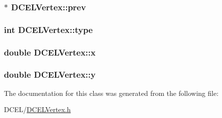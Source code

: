 \subsubsection[{\texorpdfstring{prev}{prev}}]{$\ast$ D\+C\+E\+L\+Vertex\+::prev}\hypertarget{classDCELVertex_a00e5cbac7901ae7c8c786597502ed6d8}{}\label{classDCELVertex_a00e5cbac7901ae7c8c786597502ed6d8}
\subsubsection[{\texorpdfstring{type}{type}}]{\setlength{\rightskip}{0pt plus 5cm}int D\+C\+E\+L\+Vertex\+::type}\hypertarget{classDCELVertex_a7c389ebf0d0887e1be79ba4da089522c}{}\label{classDCELVertex_a7c389ebf0d0887e1be79ba4da089522c}
\subsubsection[{\texorpdfstring{x}{x}}]{\setlength{\rightskip}{0pt plus 5cm}double D\+C\+E\+L\+Vertex\+::x}\hypertarget{classDCELVertex_a0a8a36f7b24698829b31ab03e01dd07d}{}\label{classDCELVertex_a0a8a36f7b24698829b31ab03e01dd07d}
\subsubsection[{\texorpdfstring{y}{y}}]{\setlength{\rightskip}{0pt plus 5cm}double D\+C\+E\+L\+Vertex\+::y}\hypertarget{classDCELVertex_aa9ca8760cf4043aeb5c7d9d981d9bb99}{}\label{classDCELVertex_aa9ca8760cf4043aeb5c7d9d981d9bb99}


The documentation for this class was generated from the following file\+:\begin{DoxyCompactItemize}
\item 
D\+C\+E\+L/\hyperlink{DCELVertex_8h}{D\+C\+E\+L\+Vertex.\+h}\end{DoxyCompactItemize}
